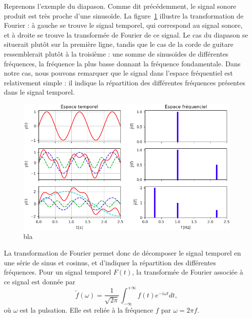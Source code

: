 \documentclass[11pt, twoside, a4paper, openright]{report}
\begin{document}
Reprenons l'exemple du diapason. Comme dit précédemment, le signal sonore produit est très proche d'une sinusoïde. La figure~\ref{fig:example_tf} illustre la transformation de Fourier : à gauche se trouve le signal temporel, qui correspond au signal sonore, et à droite se trouve la transformée de Fourier de ce signal. Le cas du diapason se situerait plutôt sur la première ligne, tandis que le cas de la corde de guitare ressemblerait plutôt à la troisième : une somme de sinusoïdes de différentes fréquences, la fréquence la plus basse donnant la fréquence fondamentale. Dans notre cas, nous pouvons remarquer que le signal dans l'espace fréquentiel est relativement simple : il indique la répartition des différentes fréquences présentes dans le signal temporel.
\begin{figure}[h]
  \centering
  \includegraphics[scale=0.5]{example_tf}
  \caption{bla}
  \label{fig:example_tf}
\end{figure}

La transformation de Fourier permet donc de décomposer le signal temporel en une série de sinus et cosinus, et d'indiquer la répartition des différentes fréquences. Pour un signal temporel $F(t)$, la transformée de Fourier associée à ce signal est donnée par
\begin{equation}
  \label{eq:def_tf}
  \tilde f(\omega) = \frac{1}{\sqrt{2 \pi}} \int_{-\infty}^{+\infty}f(t) e^{-i \omega t} dt ,
\end{equation}
où $\omega$ est la pulsation. Elle est reliée à la fréquence $f$ par $\omega = 2 \pi f$.



\end{document}
